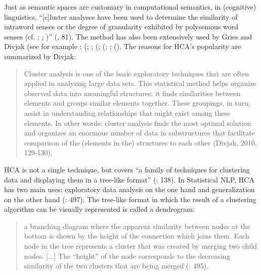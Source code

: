 Just as semantic spaces are customary in computational semantics, in (cognitive) linguistics, “[c]luster analyses have been used to determine the similarity of intraword senses or the degree of granularity exhibited by polysemous word senses (cf. \citealt{steinberg_empirical_1971}; \citealt{sandra_network_1995}; \citealt{putz_prepositional_1996})” (\citealt{Gries2006b}, 81). The method has also been extensively used by Gries and Divjak (see for example \citealt{divjak_ways_2006, divjak_structuring_2010}; (\citealt{glynn_cluster_2014}; \citealt{divjak_ways_2006, evans_behavioral_2009}; (\citealt{Gries2006}; (\citealt{evans_behavioral_2009}; \citealt{gries_behavioral_2010}; (\citealt{DeshorsGries2014}). The reasons for HCA’s popularity are summarized by Divjak:


\begin{quote}
Cluster analysis is one of the basic exploratory techniques that are often applied in analyzing large data sets. This statistical method helps organize observed data into meaningful structures: it finds similarities between elements and groups similar elements together. These groupings, in turn, assist in understanding relationships that might exist among these elements. In other words: cluster analysis finds the most optimal solution and organizes an enormous number of data in substructures that facilitate comparison of the (elements in the) structures to each other (Divjak, 2010, 129-130).
\end{quote}


HCA is not a single technique, but covers “a family of techniques for clustering data and displaying them in a tree-like format” (\citealt{baayen_analyzing_2008}: 138). In Statistical NLP, HCA has two main uses: exploratory data analysis on the one hand and generalization on the other hand (\citealt{manning_foundations_1999}: 497). The tree-like format in which the result of a clustering algorithm can be visually represented is called a dendrogram:


\begin{quote}
a branching diagram where the apparent similarity between nodes at the bottom is shown by the height of the connection which joins them. Each node in the tree represents a cluster that was created by merging two child nodes. [...] The “height” of the node corresponds to the decreasing similarity of the two clusters that are being merged (\citealt{manning_foundations_1999}: 495).
\end{quote}


